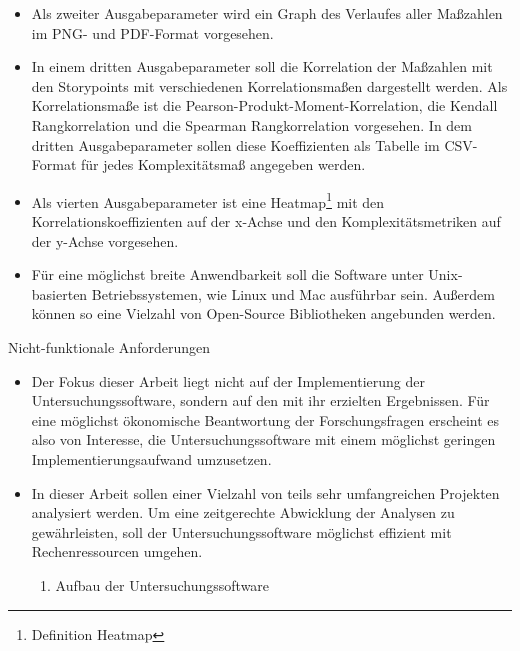 \begin{itemize}
\item
    Als zweiter Ausgabeparameter wird ein Graph des Verlaufes aller
    Maßzahlen im PNG- und PDF-Format vorgesehen.
\item
    In einem dritten Ausgabeparameter soll die Korrelation der Maßzahlen
    mit den Storypoints mit verschiedenen Korrelationsmaßen dargestellt
    werden. Als Korrelationsmaße ist die
    Pearson-Produkt-Moment-Korrelation, die Kendall Rangkorrelation und
    die Spearman Rangkorrelation vorgesehen. In dem dritten
    Ausgabeparameter sollen diese Koeffizienten als Tabelle im CSV-Format
    für jedes Komplexitätsmaß angegeben werden.
\item
    Als vierten Ausgabeparameter ist eine Heatmap\footnote{Definition
    Heatmap} mit den Korrelationskoeffizienten auf der x-Achse und den
    Komplexitätsmetriken auf der y-Achse vorgesehen.
\end{itemize}

\begin{itemize}
\item
    Für eine möglichst breite Anwendbarkeit soll die Software unter
    Unix-basierten Betriebssystemen, wie Linux und Mac ausführbar sein.
    Außerdem können so eine Vielzahl von Open-Source Bibliotheken
    angebunden werden.
\end{itemize}

Nicht-funktionale Anforderungen

\begin{itemize}
\item
    Der Fokus dieser Arbeit liegt nicht auf der Implementierung der
    Untersuchungssoftware, sondern auf den mit ihr erzielten Ergebnissen.
    Für eine möglichst ökonomische Beantwortung der Forschungsfragen
    erscheint es also von Interesse, die Untersuchungssoftware mit einem
    möglichst geringen Implementierungsaufwand umzusetzen.
\item
    In dieser Arbeit sollen einer Vielzahl von teils sehr umfangreichen
    Projekten analysiert werden. Um eine zeitgerechte Abwicklung der
    Analysen zu gewährleisten, soll der Untersuchungssoftware möglichst
    effizient mit Rechenressourcen umgehen.

    \begin{enumerate}
    \def\labelenumi{\arabic{enumi}.}
    \item
    \protect\hypertarget{_Toc102600182}{}{}Aufbau der
    Untersuchungssoftware
    \end{enumerate}
\end{itemize}

